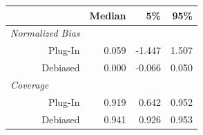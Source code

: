 
\begin{tabular}{r|rrr}
\toprule
  & Median & 5\% & 95\%\\
\midrule
\multicolumn{1}{l|}{\textit{Normalized Bias}}\\
Plug-In & 0.059 & -1.447 & 1.507\\
Debiased & 0.000 & -0.066 & 0.050\\
\midrule
\multicolumn{1}{l|}{\textit{Coverage}}\\
Plug-In & 0.919 & 0.642 & 0.952\\
Debiased & 0.941 & 0.926 & 0.953\\
\bottomrule
\end{tabular}
